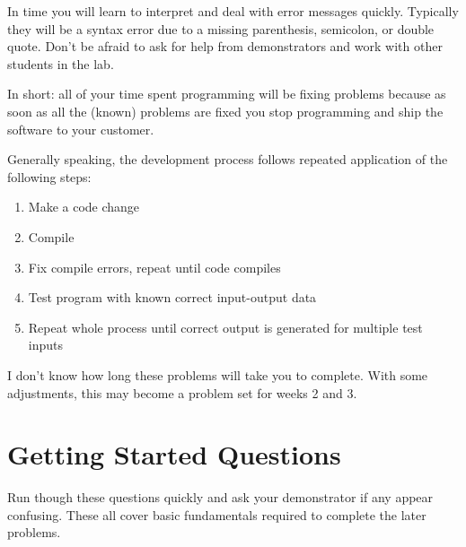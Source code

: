 \documentclass{lab}
\begin{document}
In time you will learn to interpret and deal with error messages quickly. Typically they will be a syntax error due to a missing parenthesis, semicolon, or double quote. Don't be afraid to ask for help from demonstrators and work with other students in the lab.

In short: all of your time spent programming will be fixing problems because as soon as all the (known) problems are fixed you stop programming and ship the software to your customer.

Generally speaking, the development process follows repeated application of the following steps:

\begin{enumerate}
\item Make a code change
\item Compile
\item Fix compile errors, repeat until code compiles
\item Test program with known correct input-output data
\item Repeat whole process until correct output is generated for multiple test inputs
\end{enumerate}

I don't know how long these problems will take you to complete. With some adjustments, this may become a problem set for weeks 2 and 3.
\pagebreak
\section{Getting Started Questions}

Run though these questions quickly and ask your demonstrator if any appear confusing. These all cover basic fundamentals required to complete the later problems.
\end{document}
